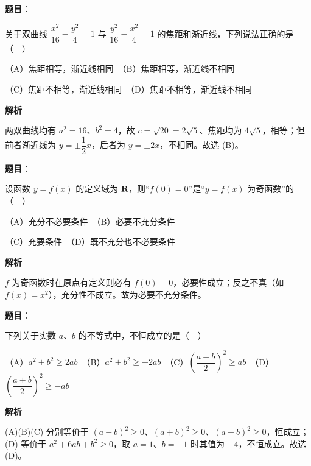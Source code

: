 \begin{answer}

\textbf{题目}：

关于双曲线 \(\dfrac{x^{2}}{16}-\dfrac{y^{2}}{4}=1\) 与 \(\dfrac{y^{2}}{16}-\dfrac{x^{2}}{4}=1\) 的焦距和渐近线，下列说法正确的是（　）

（A）焦距相等，渐近线相同　（B）焦距相等，渐近线不相同

（C）焦距不相等，渐近线相同　（D）焦距不相等，渐近线不相同

\textbf{解析}

两双曲线均有 \(a^{2}=16\)、\(b^{2}=4\)，故 \(c=\sqrt{20}=2\sqrt{5}\)、焦距均为 \(4\sqrt{5}\)，相等；但前者渐近线为 \(y=\pm\dfrac{1}{2}x\)，后者为 \(y=\pm 2x\)，不相同。故选 (B)。


\end{answer}
\begin{answer}

\textbf{题目}：

设函数 \(y=f(x)\) 的定义域为 \(\mathbf{R}\)，则“\(f(0)=0\)”是“\(y=f(x)\) 为奇函数”的（　）

（A）充分不必要条件　（B）必要不充分条件

（C）充要条件　（D）既不充分也不必要条件

\textbf{解析}

\(f\) 为奇函数时在原点有定义则必有 \(f(0)=0\)，必要性成立；反之不真（如 \(f(x)=x^{2}\)），充分性不成立。故为必要不充分条件。


\end{answer}
\begin{answer}

\textbf{题目}：

下列关于实数 \(a\)、\(b\) 的不等式中，不恒成立的是（　）

（A）\(a^{2}+b^{2}\geqslant 2ab\)　（B）\(a^{2}+b^{2}\geqslant -2ab\)　（C）\(\left(\dfrac{a+b}{2}\right)^{2}\geqslant ab\)　（D）\(\left(\dfrac{a+b}{2}\right)^{2}\geqslant -ab\)

\textbf{解析}

(A)(B)(C) 分别等价于 \((a-b)^{2}\geqslant 0\)、\((a+b)^{2}\geqslant 0\)、\((a-b)^{2}\geqslant 0\)，恒成立；(D) 等价于 \(a^{2}+6ab+b^{2}\geqslant 0\)，取 \(a=1\)、\(b=-1\) 时其值为 \(-4\)，不恒成立。故选 (D)。


\end{answer}
